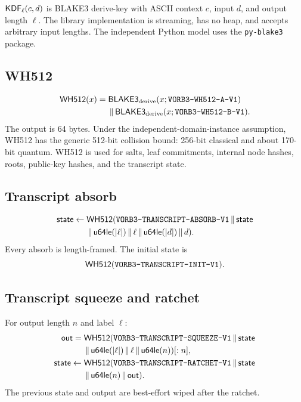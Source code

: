 \documentclass[11pt,a4paper]{article}
\begin{document}
$\mathsf{KDF}_\ell(c,d)$ is BLAKE3 derive-key with ASCII context $c$, input $d$, and
output length $\ell$. The library implementation is streaming, has no heap,
and accepts arbitrary input lengths. The independent Python model uses the
\texttt{py-blake3} package.

\subsection{WH512}

\begin{align*}
\mathsf{WH512}(x)={}&\mathsf{BLAKE3}_{\mathrm{derive}}(x;\texttt{VORB3-WH512-A-V1})\\
&\,\|\,\mathsf{BLAKE3}_{\mathrm{derive}}(x;\texttt{VORB3-WH512-B-V1}).
\end{align*}
The output is 64 bytes. Under the independent-domain-instance assumption,
WH512 has the generic 512-bit collision bound: 256-bit classical and about
170-bit quantum. WH512 is used for salts, leaf commitments, internal node
hashes, roots, public-key hashes, and the transcript state.

\subsection{Transcript absorb}

\begin{align*}
\mathsf{state}\gets{}&
\mathsf{WH512}(\texttt{VORB3-TRANSCRIPT-ABSORB-V1}\,\|\,\mathsf{state}\\
&\,\|\,\mathsf{u64le}(|\ell|)\,\|\,\ell
\,\|\,\mathsf{u64le}(|d|)\,\|\, d).
\end{align*}
Every absorb is length-framed. The initial state is
\[
\mathsf{WH512}(\texttt{VORB3-TRANSCRIPT-INIT-V1}).
\]

\subsection{Transcript squeeze and ratchet}

For output length $n$ and label $\ell$:
\begin{align}
\mathsf{out}={}&
\mathsf{WH512}(\texttt{VORB3-TRANSCRIPT-SQUEEZE-V1}\,\|\,\mathsf{state}\\
&\,\|\,\mathsf{u64le}(|\ell|)\,\|\,\ell\,\|\,\mathsf{u64le}(n))[:n],\\
\mathsf{state}\gets{}&
\mathsf{WH512}(\texttt{VORB3-TRANSCRIPT-RATCHET-V1}\,\|\,\mathsf{state}\\
&\,\|\,\mathsf{u64le}(n)\,\|\,\mathsf{out}).
\end{align}
The previous state and output are best-effort wiped after the ratchet.
\end{document}

